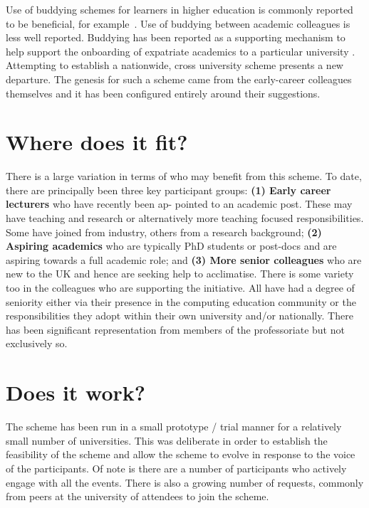 \documentclass[sigconf]{acmart}
\begin{document}
Use of buddying schemes for learners in higher education is commonly reported to be beneficial, for example~\cite{Hayes2020,May20}. Use of buddying between academic colleagues is less well reported. Buddying has been reported as a supporting mechanism to help support the onboarding of expatriate academics to a particular university \cite{Wilkins2019}. Attempting to establish a nationwide, cross university scheme presents a new departure. The genesis for such a scheme came from the early-career colleagues themselves and it has been configured entirely around their suggestions.
	
\section{Where does it fit?}

There is a large variation in terms of who may benefit from this scheme. To date, there are principally been three key participant groups: \textbf{(1) Early career lecturers} who have recently been ap- pointed to an academic post. These may have teaching and research or alternatively more teaching focused responsibilities. Some have joined from industry, others from a research background; \textbf{(2) Aspiring academics }who are typically PhD students or post-docs and are aspiring towards a full academic role; and \textbf{ (3) More senior colleagues} who are new to the UK and hence are seeking help to acclimatise. There is some variety too in the colleagues who are supporting the initiative. All have had a degree of seniority either via their presence in the computing education community or the responsibilities they adopt within their own university and/or nationally. There has been significant representation from members of the professoriate but not exclusively so. 

\section{Does it work?}	
\label{Sec:DoesItWork}
The scheme has been run in a small prototype / trial manner for a relatively small number of universities. This was deliberate in order to establish the feasibility of the scheme and allow the scheme to evolve in response to the voice of the participants. Of note is there are a number of participants who actively engage with all the events. There is also a growing number of requests, commonly from peers at the university of attendees to join the scheme. 
\end{document}
